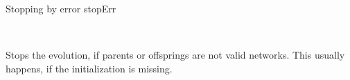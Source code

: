 

\begin{moduledoc}{Stopping by error }{stopErr}
  \item[\KeyWord{no parameter}]~
\end{moduledoc}

Stops the evolution, if parents or offsprings are not valid networks.
This usually  happens, if the initialization is missing.


